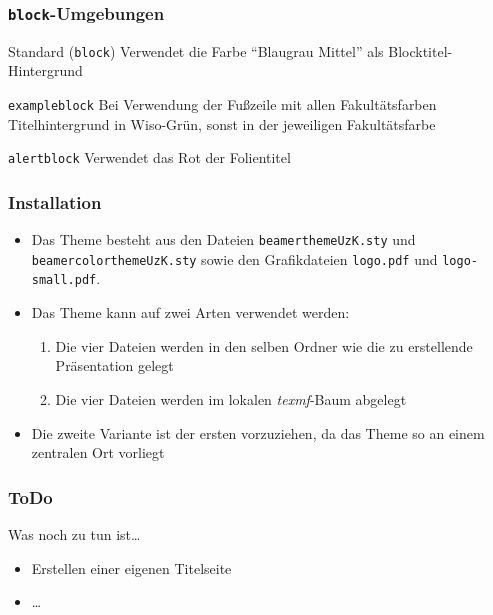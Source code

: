 \documentclass[9pt]{beamer}
\begin{document}
\begin{frame}
  \frametitle{\texttt{block}-Umgebungen}
  \begin{block}{Standard (\texttt{block})}
    Verwendet die Farbe "`Blaugrau Mittel"' als Blocktitel-Hintergrund
  \end{block}

  \begin{exampleblock}{\texttt{exampleblock}}
    Bei Verwendung der Fußzeile mit allen Fakultätsfarben
    Titelhintergrund in Wiso-Grün, sonst in der jeweiligen
    Fakultätsfarbe
  \end{exampleblock}

  \begin{alertblock}{\texttt{alertblock}}
    Verwendet das Rot der Folientitel
  \end{alertblock}

\end{frame}


\begin{frame}
  \frametitle{Installation}
  \begin{itemize}
  \item Das Theme besteht aus den Dateien
    \texttt{beamerthemeUzK.sty} und \texttt{beamercolorthemeUzK.sty}
    sowie den Grafikdateien \texttt{logo.pdf} und
    \texttt{logo-small.pdf}.
  \item Das Theme kann auf zwei Arten verwendet werden:
    \begin{enumerate}
    \item Die vier Dateien werden in den selben Ordner wie die zu
      erstellende Präsentation gelegt
    \item Die vier Dateien werden im lokalen \emph{texmf}-Baum abgelegt
    \end{enumerate}
  \item Die zweite Variante ist der ersten vorzuziehen, da das Theme
    so an einem zentralen Ort vorliegt
  \end{itemize}
\end{frame}


\begin{frame}
  \frametitle{ToDo}

  \begin{block}{Was noch zu tun ist\ldots}
    \begin{itemize}
    \item Erstellen einer eigenen Titelseite
    \item \ldots
    \end{itemize}
  \end{block}

\end{frame}
\end{document}
